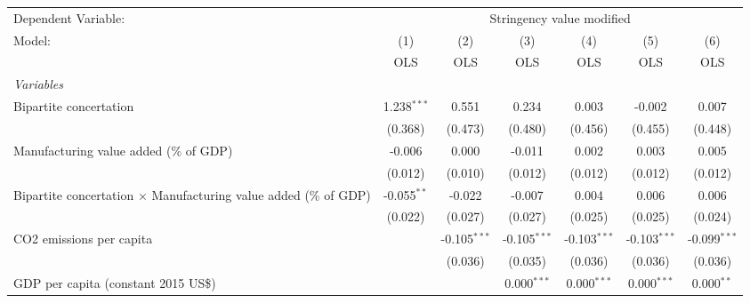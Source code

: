 
\begingroup
\centering
\begin{tabular}{lcccccc}
   \toprule
   Dependent Variable: & \multicolumn{6}{c}{Stringency value modified}\\
   Model:                                                                  & (1)           & (2)            & (3)            & (4)            & (5)            & (6)\\  
                                                                           &  OLS          & OLS            & OLS            & OLS            & OLS            & OLS\\  
   \midrule
   \emph{Variables}\\
   Bipartite concertation                                                  & 1.238$^{***}$ & 0.551          & 0.234          & 0.003          & -0.002         & 0.007\\   
                                                                           & (0.368)       & (0.473)        & (0.480)        & (0.456)        & (0.455)        & (0.448)\\   
   Manufacturing value added (\% of GDP)                                   & -0.006        & 0.000          & -0.011         & 0.002          & 0.003          & 0.005\\   
                                                                           & (0.012)       & (0.010)        & (0.012)        & (0.012)        & (0.012)        & (0.012)\\   
   Bipartite concertation $\times$ Manufacturing value added (\% of GDP)   & -0.055$^{**}$ & -0.022         & -0.007         & 0.004          & 0.006          & 0.006\\   
                                                                           & (0.022)       & (0.027)        & (0.027)        & (0.025)        & (0.025)        & (0.024)\\   
   CO2 emissions per capita                                                &               & -0.105$^{***}$ & -0.105$^{***}$ & -0.103$^{***}$ & -0.103$^{***}$ & -0.099$^{***}$\\   
                                                                           &               & (0.036)        & (0.035)        & (0.036)        & (0.036)        & (0.036)\\   
   GDP per capita (constant 2015 US\$)                                     &               &                & 0.000$^{***}$  & 0.000$^{***}$  & 0.000$^{***}$  & 0.000$^{**}$\\   

\end{tabular}

